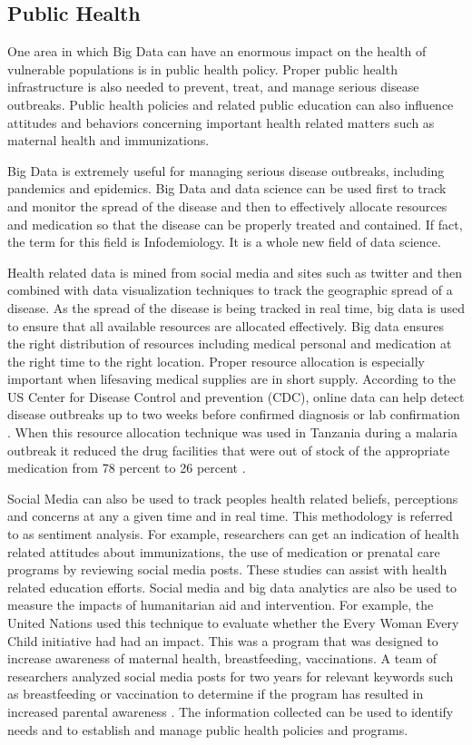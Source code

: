 \documentclass[sigconf]{acmart}
\begin{document}
\subsection{Public Health}
One area in which Big Data can have an enormous impact on the health of vulnerable populations is in public health policy. Proper public health infrastructure is also needed to prevent, treat, and manage serious disease outbreaks. Public health policies and related public education can also influence attitudes and behaviors concerning important health related matters such as maternal health and immunizations. 

Big Data is extremely useful for managing serious disease outbreaks, including pandemics and epidemics. Big Data and data science can be used first to track and monitor the spread of the disease and then to effectively allocate resources and medication so that the disease can be properly treated and contained. If fact, the term for this field is Infodemiology. It is a whole new field of data science.

Health related data is mined from social media and sites such as twitter and then combined with data visualization techniques to track the geographic spread of a disease. As the spread of the disease is being tracked in real time, big data is used to ensure that all available resources are allocated effectively. Big data ensures the right distribution of resources including medical personal and medication at the right time to the right location. Proper resource allocation is especially important when lifesaving medical supplies are in short supply. According to the US Center for Disease Control and prevention (CDC), online data can help detect disease outbreaks up to two weeks before confirmed diagnosis or lab confirmation \cite{www-google-GloPls}. When this resource allocation technique was used in Tanzania during a malaria outbreak it reduced the drug facilities that were out of stock of the appropriate medication from 78 percent to 26 percent \cite{DevEcon}.

Social Media can also be used to track peoples health related beliefs, perceptions and concerns at any a given time and in real time. This methodology is referred to as sentiment analysis. For example, researchers can get an indication of health related attitudes about immunizations, the use of medication or prenatal care programs by reviewing social media posts.  These studies can assist with health related education efforts. Social media and big data analytics are also be used to measure the impacts of humanitarian aid and intervention. For example, the United Nations used this technique to evaluate whether the Every Woman Every Child initiative had had an impact. This was a program that was designed to increase awareness of maternal health, breastfeeding, vaccinations. A team of researchers analyzed social media posts for two years for relevant keywords such as breastfeeding or vaccination to determine if the program has resulted in increased parental awareness \cite{DevEcon}. The information collected can be used to identify needs and to establish and manage public health policies and programs.
\end{document}
